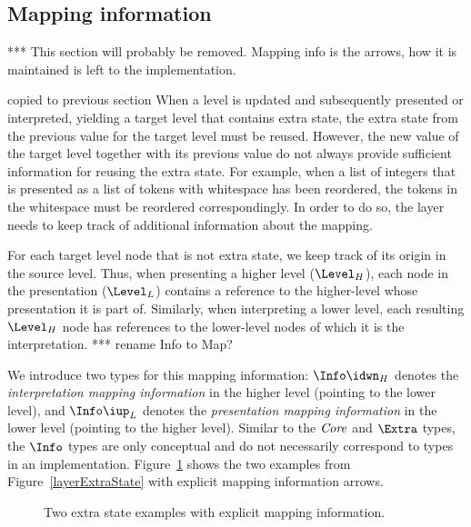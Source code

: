 \bc
%																
\subsection{Mapping information} \label{sect:mappingInformation}

*** This section will probably be removed. Mapping info is the arrows, how it is maintained is left to the implementation.
\ec

\bc     copied to previous section
When a level is updated and subsequently presented or interpreted, yielding a target level that contains extra state, the extra state from the previous value for the target level must be reused. However, the new value of the target level together with its previous value do not always provide sufficient information for reusing the extra state. For example, when a list of integers that is presented as a list of tokens with whitespace has been reordered, the tokens in the whitespace must be reordered correspondingly.  In order to do so, the layer needs to keep track of additional information about the mapping.

For each target level node that is not extra state, we keep track of its origin in the source level. Thus, when presenting a higher level ($\Level_{H}$), each node in the presentation ($\Level_{L}$) contains a reference to the higher-level whose presentation it is part of. Similarly, when interpreting a lower level, each resulting $\Level_{H}$ node has references to the lower-level nodes of which it is the interpretation. 
\ec
\bc
*** rename Info to Map?

We introduce two types for this mapping information: $\Info\idwn_{H}$ denotes the {\em interpretation mapping information} in the higher level (pointing to the lower level), and $\Info\iup_{L}$ denotes the {\em presentation mapping information} in the lower level (pointing to the higher level). Similar to the $\mathit{Core}$ and $\Extra$ types, the $\Info$ types are only conceptual and do not necessarily correspond to types in an implementation. Figure~\ref{coreExtraInfoExamples} shows the two examples from Figure~\ref{layerExtraState} with explicit mapping information arrows. 

\begin{figure}
\begin{center}
\begin{center}
\end{center}
\caption{Two extra state examples with explicit mapping information.}\label{coreExtraInfoExamples} 
\end{center}
\end{figure}

